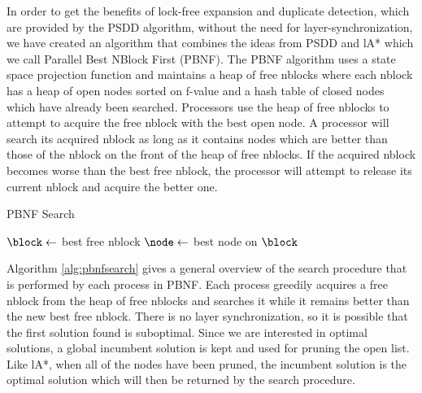 \documentclass{article}
\begin{document}
In order to get the benefits of lock-free expansion and duplicate
detection, which are provided by the PSDD algorithm, without the need
for layer-synchronization, we have created an algorithm that combines
the ideas from PSDD and lA* which we call Parallel Best NBlock First
(PBNF).  The PBNF algorithm uses a state space projection function and
maintains a heap of free nblocks where each nblock has a heap of open
nodes sorted on f-value and a hash table of closed nodes which have
already been searched.  Processors use the heap of free nblocks to
attempt to acquire the free nblock with the best open node.  A
processor will search its acquired nblock as long as it contains nodes
which are better than those of the nblock on the front of the heap of
free nblocks.  If the acquired nblock becomes worse than the best free
nblock, the processor will attempt to release its current nblock and
acquire the better one.

\begin{algorithm}
  \caption{PBNF Search}
  \label{alg:pbnfsearch}
   {
    $\block \leftarrow$ best free nblock\;
     {
      $\node \leftarrow$ best node on $\block$\;
    }
  }
\end{algorithm}

Algorithm \ref{alg:pbnfsearch} gives a general overview of the search
procedure that is performed by each process in PBNF.  Each process
greedily acquires a free nblock from the heap of free nblocks and
searches it while it remains better than the new best free nblock.
There is no layer synchronization, so it is possible that the first
solution found is suboptimal.  Since we are interested in optimal
solutions, a global incumbent solution is kept and used for pruning
the open list.  Like lA*, when all of the nodes have been pruned, the
incumbent solution is the optimal solution which will then be returned
by the search procedure.
\end{document}
